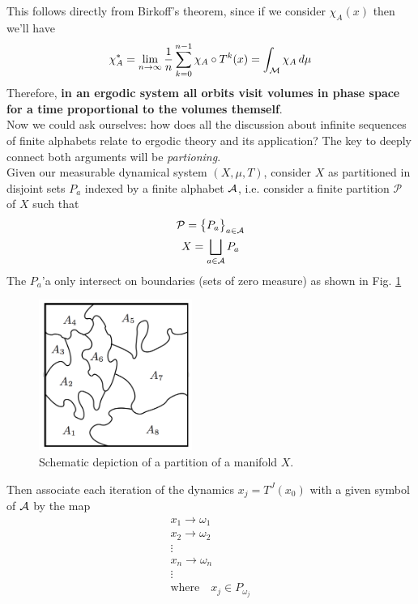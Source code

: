 This follows directly from Birkoff's theorem, since if we consider $\chi_A (x)$ then we'll have 
\begin{equation*}
    \chi^*_A = \lim_{n \rightarrow \infty} \frac{1}{n} \sum_{k=0}^{n-1} \chi_A \circ T^k(x) = \int_{\mathcal{M}} \chi_A \, d\mu
\end{equation*} 
Therefore, \textbf{in an ergodic system all orbits visit volumes in phase space for a time proportional to the volumes themself}. \\
Now we could ask ourselves: how does all the discussion about infinite sequences of finite alphabets relate to ergodic theory and its application? The key to deeply connect both arguments will be \textit{partioning}. 
\\Given our measurable dynamical system $(X, \mu, T)$, consider $X$ as partitioned in disjoint sets $P_a$ indexed by a finite alphabet $\mathcal{A}$, i.e. consider a finite partition $\mathcal{P}$ of $X$ such that
\begin{gather}
    \mathcal{P} = \big\{ P_a \big\}_{a \in \mathcal{A}} \nonumber \\
    X = \bigsqcup_{a \in \mathcal{A}} P_a
\end{gather}
The $P_a$'a only intersect on boundaries (sets of zero measure) as shown in Fig. \ref{fig:partition} 
\begin{figure}[h]
    \centering
    \includegraphics[width=5cm]{img/partition.png}
    \caption{Schematic depiction of a partition of a manifold $X$.}
    \label{fig:partition}
\end{figure}
Then associate each iteration of the dynamics $x_j = T^J(x_0)$ with a given symbol of $\mathcal{A}$ by the map
\begin{gather*}
    x_1 \longrightarrow \omega_1 \\
    x_2 \longrightarrow \omega_2 \\
    \vdots \\
    x_n \longrightarrow \omega_n \\
    \vdots \\
    \text{where} \quad x_j \in P_{\omega_j}
\end{gather*}
